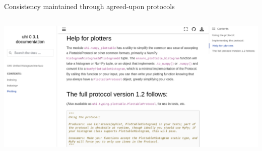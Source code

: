 \documentclass[aspectratio=169]{beamer}
\begin{document}
\begin{frame}{Consistency maintained through agreed-upon protocols}
\vspace{0.5 cm}
\begin{columns}
\includegraphics[width=\linewidth]{PLOTS/histogram-protocol-screenshot.png}
\end{columns}
\end{frame}
\end{document}
